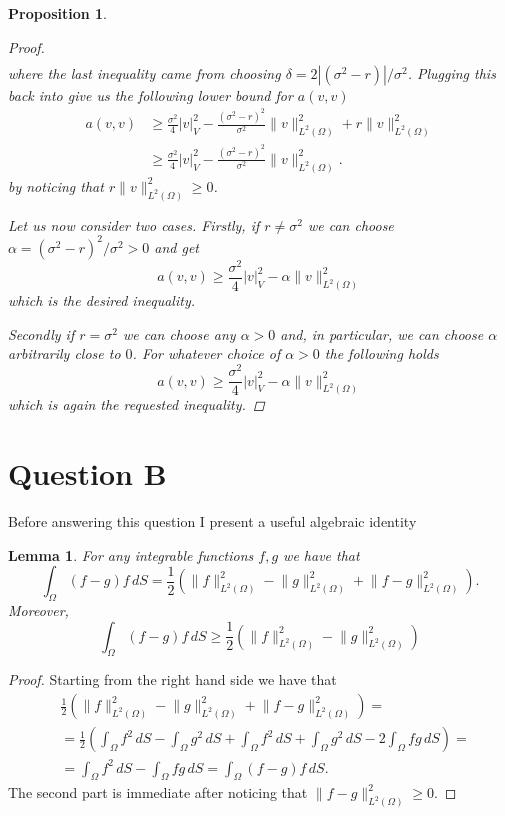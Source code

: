 \documentclass{article}
\newtheorem{lemma}[thm]{Lemma}
\newtheorem{prop}[thm]{Proposition}
\newcommand{\intS}[1]{\ensuremath{\int_{\Omega}#1 \, dS}}
\newcommand{\seminormsq}[1]{\ensuremath{|#1|_V^2}}
\newcommand{\normsq}[1]{\ensuremath{\|#1\|_{L^2(\Omega)}^2}}
\begin{document}
\begin{prop}
\begin{proof}
\begin{align*}
        \end{align*}
        where the last inequality came from choosing $\delta = 2| (\sigma^2 - r) | / \sigma^2$. Plugging this back into  give us the following lower bound for $a(v,v)$
        \begin{align*}
            a(v,v) &\geq \frac{\sigma^2}{4} \seminormsq{v} - \frac{(\sigma^2 - r)^2}{ \sigma^2} \normsq{v} + r \normsq{v}\\
            &\geq \frac{\sigma^2}{4} \seminormsq{v} - \frac{(\sigma^2 - r)^2}{ \sigma^2} \normsq{v}.
        \end{align*}
        by noticing that $r \normsq{v} \geq 0$.
        
        Let us now consider two cases. Firstly, if $r \neq \sigma^2$ we can choose $\alpha = (\sigma^2 - r)^2 / \sigma^2 > 0$ and get
        \begin{equation*}
            a(v,v) \geq \frac{\sigma^2}{4} \seminormsq{v} - \alpha \normsq{v}
        \end{equation*}
        which is the desired inequality.

        Secondly if $r = \sigma^2$ we can choose any $\alpha >0$ and, in particular, we can choose $\alpha$ arbitrarily close to $0$. For whatever choice of $\alpha > 0$ the following holds
        \begin{equation*}
            a(v,v) \geq \frac{\sigma^2}{4} \seminormsq{v} - \alpha \normsq{v}
        \end{equation*}
        which is again the requested inequality.
    \end{proof}
\end{prop}

\section{Question B}
Before answering this question I present a useful algebraic identity
\begin{lemma}\label{lemma_alg_id_and_ineq}
    For any integrable functions $f, g$ we have that
    \begin{equation*}
        \intS{(f - g)f} = \frac{1}{2}\left( \normsq{f} - \normsq{g} + \normsq{f - g}\right).
    \end{equation*}
    Moreover,
    $$\intS{(f - g)f} \geq \frac{1}{2}\left( \normsq{f} - \normsq{g} \right)$$
\end{lemma}
\begin{proof}
    Starting from the right hand side we have that
    \begin{align*}
        &\frac{1}{2}\left( \normsq{f} - \normsq{g} + \normsq{f - g}\right) =\\
        &=\frac{1}{2}\left(\intS{f^2} -  \intS{g^2} + \intS{f^2} +  \intS{g^2} - 2\intS{fg} \right) =\\
        &=\intS{f^2} - \intS{fg} = \intS{(f - g)f}.
    \end{align*}
    The second part is immediate after noticing that $\normsq{f - g} \geq 0$.
\end{proof}
\end{document}
